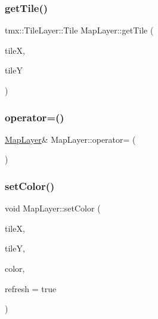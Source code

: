 \mbox{\label{classMapLayer_a347375abb72832ea3362ba0d29898f30}} 
\subsubsection{\texorpdfstring{get\+Tile()}{getTile()}}
{\footnotesize\ttfamily tmx\+::\+Tile\+Layer\+::\+Tile Map\+Layer\+::get\+Tile (\begin{DoxyParamCaption}\item[{int}]{tileX,  }\item[{int}]{tileY }\end{DoxyParamCaption})\hspace{0.3cm}{\ttfamily [inline]}}

\mbox{\label{classMapLayer_a1863f3842c104aa6d460f4d9b99ec792}} 
\subsubsection{\texorpdfstring{operator=()}{operator=()}}
{\footnotesize\ttfamily \hyperlink{classMapLayer}{Map\+Layer}\& Map\+Layer\+::operator= (\begin{DoxyParamCaption}\item[{const \hyperlink{classMapLayer}{Map\+Layer} \&}]{ }\end{DoxyParamCaption})\hspace{0.3cm}{\ttfamily [delete]}}

\mbox{\label{classMapLayer_a4dad5e08a823925292846664ce42657d}} 
\subsubsection{\texorpdfstring{set\+Color()}{setColor()}}
{\footnotesize\ttfamily void Map\+Layer\+::set\+Color (\begin{DoxyParamCaption}\item[{int}]{tileX,  }\item[{int}]{tileY,  }\item[{sf\+::\+Color}]{color,  }\item[{bool}]{refresh = {\ttfamily true} }\end{DoxyParamCaption})\hspace{0.3cm}{\ttfamily [inline]}}

